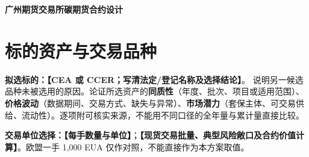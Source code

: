 \documentclass[UTF8,a4paper,11pt,oneside,fontset=fandol]{ctexart}
\newcommand{\fillin}[1]{\textcolor{promptgray}{\textbf{【#1】}}}
\newcommand{\ReportTitle}{广州期货交易所碳期货合约设计}
\begin{document}
\thispagestyle{plain} %
\begin{center}
  {\LARGE\bfseries \ReportTitle\par}
\end{center}
\vspace{0.5em}

\section{标的资产与交易品种}
\noindent\textbf{拟选标的：}\fillin{CEA 或 CCER；写清法定/登记名称及选择结论}。
说明另一候选品种未被选用的原因。论证所选资产的\textbf{同质性}（年度、批次、项目或适用范围）、\textbf{价格波动}（数据期间、交易方式、缺失与异常）、\textbf{市场潜力}（套保主体、可交易供给、流动性）。逐项附可核实来源，不能用不同口径的全年量与累计量直接比较。

\noindent\textbf{交易单位选择：}\fillin{每手数量与单位}；\fillin{现货交易批量、典型风险敞口及合约价值计算}。欧盟一手 1,000 EUA 仅作对照，不能直接作为本方案取值。
\end{document}
